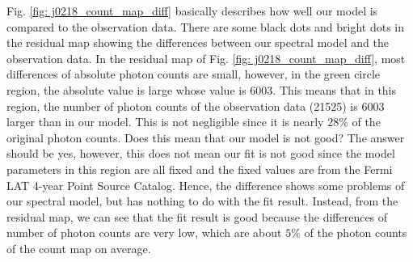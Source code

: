 \documentclass[12pt]{report}
\begin{document}
            Fig. \ref{fig: j0218_count_map_diff} basically describes how well our model is compared to the 
            observation data. There are some black dots and bright dots in the residual map showing 
            the differences between our spectral model and the observation data. In the residual map of Fig.
            \ref{fig: j0218_count_map_diff}, most differences of absolute photon counts are small, however,
            in the green circle region, the absolute value is large whose value is 6003. This means that in this region,
            the number of photon counts of the observation data (21525) is 6003 larger than in our model.  
            This is not negligible since it is nearly $28\%$ of the original photon counts. 
            Does this mean that our model is not good? The answer should be yes, however, this does 
            not mean our fit is not good since the model parameters in this region are all fixed and the 
            fixed values are from the Fermi LAT 4-year Point Source Catalog. Hence, the difference 
            shows some problems of our spectral model, but has nothing to do with the fit result. 
            Instead, from the residual map, we can see that the fit result is good because the differences
            of number of photon counts are very low, which are about $5\%$ of the photon 
            counts of the count map on average.
\end{document}
